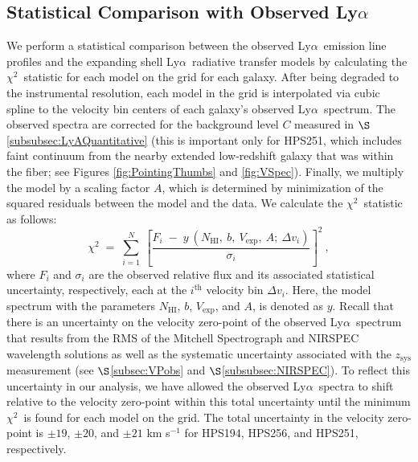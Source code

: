 \documentclass{emulateapj}
\newcommand{\lya}{Ly$\alpha$}
\def\nh{$N_{\mathrm{HI}}$}
\def\vexp{$V_{\mathrm{exp}}$}
\def\chisq{$\chi^{2}$}
\begin{document}
\subsection{Statistical Comparison with Observed \lya}\label{subsec:ModelCompare}
We perform a statistical comparison between the observed \lya\ emission line profiles and the expanding shell \lya\ radiative transfer models by calculating the \chisq\ statistic for each model on the grid for each galaxy. After being degraded to the instrumental resolution, each model in the grid is interpolated via cubic spline to the velocity bin centers of each galaxy's observed \lya\ spectrum. The observed spectra are corrected for the background level $C$ measured in $\S$\ref{subsubsec:LyAQuantitative} (this is important only for HPS251, which includes faint continuum from the nearby extended low-redshift galaxy that was within the fiber; see Figures \ref{fig:PointingThumbs} and \ref{fig:VSpec}). Finally, we multiply the model by a scaling factor $A$, which is determined by minimization of the squared residuals between the model and the data. We calculate the \chisq\ statistic as follows:
\begin{equation}\label{eq:chisquare}
\chi^{2} \; = \; \sum^{N}_{i = 1} \: \left[\frac{F_{i} \; - \; y\:(N_{\mathrm{HI}},\: b,\: V_{\mathrm{exp}},\: A;\: \Delta v_{i})}{\sigma_{i}}\right]^{2} \: ,
\end{equation}
where $F_{i}$ and $\sigma_{i}$ are the observed relative flux and its associated statistical uncertainty, respectively, each at the $i^{\mathrm{th}}$ velocity bin $\Delta v_{i}$. Here, the model spectrum with the parameters \nh, $b$, \vexp, and $A$, is denoted as $y$. Recall that there is an uncertainty on the velocity zero-point of the observed \lya\ spectrum that results from the RMS of the Mitchell Spectrograph and NIRSPEC wavelength solutions as well as the systematic uncertainty associated with the $z_{\mathrm{sys}}$ measurement (see $\S$\ref{subsec:VPobs} and $\S$\ref{subsubsec:NIRSPEC}). To reflect this uncertainty in our analysis, we have allowed the observed \lya\ spectra to shift relative to the velocity zero-point within this total uncertainty until the minimum \chisq\ is found for each model on the grid. The total uncertainty in the velocity zero-point is $\pm19$, $\pm20$, and $\pm21$ km s$^{-1}$ for HPS194, HPS256, and HPS251, respectively.
\end{document}
